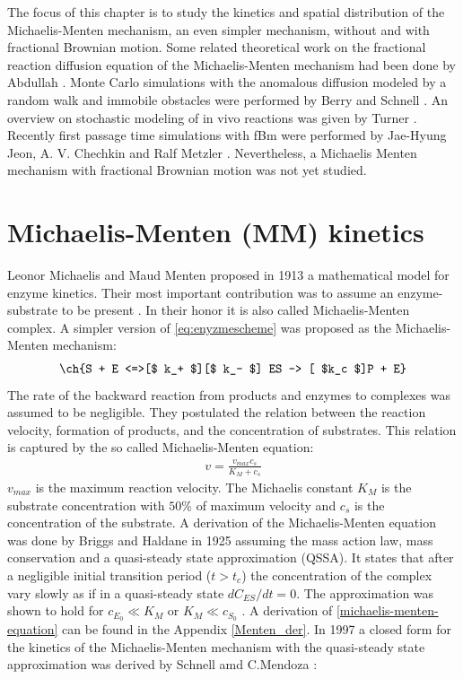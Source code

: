 \documentclass[
  a4paper,BCOR10mm,oneside,
  headsepline,footsepline,%
  fleqn,openbib
]{scrbook}
\begin{document}
The focus of this chapter is to study the kinetics and spatial distribution of the Michaelis-Menten mechanism, an even simpler mechanism, without and with fractional Brownian motion. Some related theoretical work on the fractional reaction diffusion equation of the Michaelis-Menten mechanism had been done by Abdullah \cite{AiniAbdullah2011}. Monte Carlo simulations with the anomalous diffusion modeled by a random walk and immobile obstacles were performed by Berry and Schnell \cite{Berry2002, Schnell2004}. An overview on stochastic modeling of in vivo reactions was given by Turner \cite{Turner2004}. Recently first passage time simulations with fBm  were performed by Jae-Hyung Jeon, A. V. Chechkin and Ralf Metzler \cite{Jeon2014}. Nevertheless, a Michaelis Menten mechanism with fractional Brownian motion was not yet studied.
\section{Michaelis-Menten (MM) kinetics}
Leonor Michaelis and Maud Menten  proposed in 1913 a mathematical model for enzyme kinetics. Their most important contribution was to assume an enzyme-substrate to be present \cite{michaelis1913kinetik}. In their honor it is also called Michaelis-Menten complex. A simpler version of \cref{eq:enyzmescheme} was proposed as the Michaelis-Menten mechanism:
\begin{align} \label{eq:michaelismechanism}
\ch{S + E <=>[$ k_+ $][$ k_- $] ES -> [ $k_c $]P + E}
\end{align}
 The rate of the backward reaction from products and enzymes to  complexes was assumed to be negligible. They postulated the relation between the reaction velocity, formation of products, and the concentration of substrates. This relation is captured by the so called Michaelis-Menten equation:
\begin{align} \label{michaelis-menten-equation}
 v=\frac{v_{max} c_s}{K_M+ c_s}
\end{align}
$v_{max}$ is the maximum reaction velocity. The Michaelis constant $K_M$ is the substrate concentration with $50 \%$ of maximum velocity and $c_s$  is the concentration of the substrate. A derivation of the Michaelis-Menten equation was done by Briggs and Haldane in 1925 assuming the mass action law, mass conservation and a quasi-steady state approximation (QSSA). It states that after a negligible initial transition period ($t>t_c$) the concentration of the complex vary slowly as if in a quasi-steady state $dC_{ES}/dt=0$. The approximation was shown to hold for $c_{E_0}\ll K_M \text{ or } K_M \ll c_{S_0}$ \cite{Palsson1987}. A derivation of \cref{michaelis-menten-equation} can be found in the Appendix \ref{Menten_der}. In 1997 a closed form for the kinetics of the Michaelis-Menten mechanism with the quasi-steady state approximation was derived by Schnell amd C.Mendoza \cite{Schnell1997}:
\end{document}
